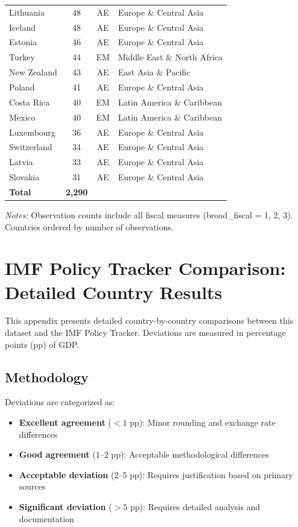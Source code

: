 \documentclass[12pt]{article}
\begin{document}
\begin{table}[htbp]
\begin{threeparttable}
\begin{tabular}{@{}lccl@{}}
Lithuania & 48 & AE & Europe \& Central Asia \\
Iceland & 48 & AE & Europe \& Central Asia \\
Estonia & 46 & AE & Europe \& Central Asia \\
Turkey & 44 & EM & Middle East \& North Africa \\
New Zealand & 43 & AE & East Asia \& Pacific \\
Poland & 41 & AE & Europe \& Central Asia \\
Costa Rica & 40 & EM & Latin America \& Caribbean \\
Mexico & 40 & EM & Latin America \& Caribbean \\
Luxembourg & 36 & AE & Europe \& Central Asia \\
Switzerland & 34 & AE & Europe \& Central Asia \\
Latvia & 33 & AE & Europe \& Central Asia \\
Slovakia & 31 & AE & Europe \& Central Asia \\
\midrule
\textbf{Total} & \textbf{2,290} & & \\
\bottomrule
\end{tabular}
\begin{tablenotes}
\scriptsize
\item \textit{Notes:} Observation counts include all fiscal measures (broad\_fiscal = 1, 2, 3). Countries ordered by number of observations.
\end{tablenotes}
\end{threeparttable}
\end{table}




\newpage
\section{IMF Policy Tracker Comparison: Detailed Country Results}
\label{app:imf_deviations}

This appendix presents detailed country-by-country comparisons between this dataset and the IMF Policy Tracker. Deviations are measured in percentage points (pp) of GDP.

\subsection{Methodology}

Deviations are categorized as:
\begin{itemize}
\item \textbf{Excellent agreement} ($<1$ pp): Minor rounding and exchange rate differences
\item \textbf{Good agreement} (1--2 pp): Acceptable methodological differences
\item \textbf{Acceptable deviation} (2--5 pp): Requires justification based on primary sources
\item \textbf{Significant deviation} ($>5$ pp): Requires detailed analysis and documentation
\end{itemize}
\end{document}
